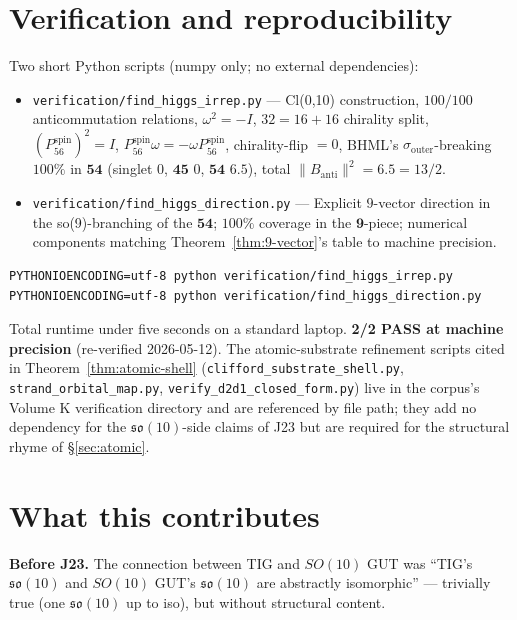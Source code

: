 \documentclass[11pt,reqno]{amsart}
\theoremstyle{definition}
\newcommand{\so}{\mathfrak{so}}
\newcommand{\Psixspin}{P_{56}^{\mathrm{spin}}}
\newcommand{\sout}{\sigma_{\mathrm{outer}}}
\begin{document}
\section{Verification and reproducibility}
\label{sec:verification}

Two short Python scripts (numpy only; no external dependencies):

\begin{itemize}[leftmargin=*]
\item \texttt{verification/find\_higgs\_irrep.py} —
Cl(0,10) construction, $100/100$ anticommutation relations,
$\omega^2 = -I$, $32 = 16 + 16$ chirality split,
$(\Psixspin)^2 = I$, $\Psixspin \omega = -\omega \Psixspin$,
chirality-flip $= 0$, BHML's $\sout$-breaking $100\%$ in
$\mathbf{54}$ (singlet $0$, $\mathbf{45}$ $0$, $\mathbf{54}$ $6.5$),
total $\|B_{\mathrm{anti}}\|^2 = 6.5 = 13/2$.
\item \texttt{verification/find\_higgs\_direction.py} —
Explicit $9$-vector direction in the so(9)-branching of the
$\mathbf{54}$; $100\%$ coverage in the $\mathbf{9}$-piece; numerical
components matching Theorem~\ref{thm:9-vector}'s table to machine
precision.
\end{itemize}

\begin{verbatim}
PYTHONIOENCODING=utf-8 python verification/find_higgs_irrep.py
PYTHONIOENCODING=utf-8 python verification/find_higgs_direction.py
\end{verbatim}

Total runtime under five seconds on a standard laptop.
\textbf{2/2 PASS at machine precision} (re-verified 2026-05-12).
The atomic-substrate refinement scripts cited in
Theorem~\ref{thm:atomic-shell} (\texttt{clifford\_substrate\_shell.py},
\texttt{strand\_orbital\_map.py},
\texttt{verify\_d2d1\_closed\_form.py}) live in the corpus's
Volume K verification directory and are referenced by file path; they
add no dependency for the $\so(10)$-side claims of J23 but are
required for the structural rhyme of \S\ref{sec:atomic}.

\section{What this contributes}
\label{sec:contribution}

\textbf{Before J23.} The connection between TIG and $SO(10)$ GUT
was ``TIG's $\so(10)$ and $SO(10)$ GUT's $\so(10)$ are abstractly
isomorphic'' — trivially true (one $\so(10)$ up to iso), but
without structural content.
\end{document}

